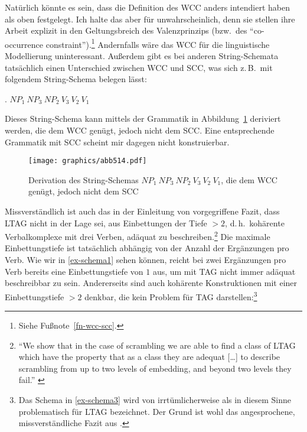 Natürlich könnte es sein, dass \cite{Joshi:Becker:Rambow:00} die Definition des WCC anders intendiert haben als oben festgelegt. Ich halte das aber für unwahrscheinlich, denn sie stellen ihre Arbeit explizit in den Geltungsbreich des Valenzprinzips (bzw.\ des "`co-occurrence constraint"').\footnote{Siehe Fu\ss note~\ref{fn-wcc-scc}.} Andernfalls wäre das WCC für die linguistische Modellierung uninteressant. Au\ss erdem gibt es bei anderen String-Schemata tatsächlich einen Unterschied zwischen WCC und SCC, was sich z.\,B.\ mit folgendem String-Schema belegen lässt:    

\ex. $\mathit{NP}_1 ~ \mathit{NP}_3 ~ \mathit{NP}_2 ~ V_3 ~ V_2 ~ V_1$\label{ex-schema-132}

Dieses String-Schema kann mittels der Grammatik in Abbildung~\ref{fig-schema-132} deriviert werden, die dem WCC genügt, jedoch nicht dem SCC. Eine entsprechende Grammatik mit SCC scheint mir dagegen nicht konstruierbar.
\begin{figure}[t]
\centering
\texttt{[image: graphics/abb514.pdf]}
\caption{\label{fig-schema-132}Derivation des String-Schemas $\mathit{NP}_1 ~ \mathit{NP}_3 ~ \mathit{NP}_2 ~ V_3 ~ V_2 ~ V_1$, die dem WCC genügt, jedoch nicht dem  SCC}
\end{figure}

\newpage
Missverständlich ist auch das in der Einleitung von \cite{Joshi:Becker:Rambow:00} vorgegriffene Fazit, dass LTAG nicht in der Lage sei,  aus Einbettungen der Tiefe $>2$, d.\,h.\ kohärente Verbalkomplexe mit drei Verben, adäquat zu beschreiben.\footnote{"`We show that in the case of scrambling we are able to find a class of LTAG which have the property that as a class they are adequat [\ldots] to describe scrambling from up to two levels of embedding, and beyond two levels they fail."' \citep[167]{Joshi:Becker:Rambow:00}} Die maximale Einbettungstiefe ist tatsächlich abhängig von der Anzahl der Ergänzungen pro Verb. Wie wir in \ref{ex-schema1} sehen können, reicht bei zwei Ergänzungen pro Verb bereits eine Einbettungstiefe von $1$ aus, um mit TAG nicht immer adäquat beschreibbar zu sein. Andererseits sind auch kohärente Konstruktionen mit einer Einbettungstiefe $>2$ denkbar, die kein Problem für TAG darstellen:\footnote{Das Schema in \ref{ex-schema3} wird von \citet[190]{Kallmeyer:05} irrtümlicherweise als in diesem Sinne problematisch für LTAG bezeichnet. Der Grund ist wohl das angesprochene, missverständliche Fazit aus \citet[167]{Joshi:Becker:Rambow:00}.} 

